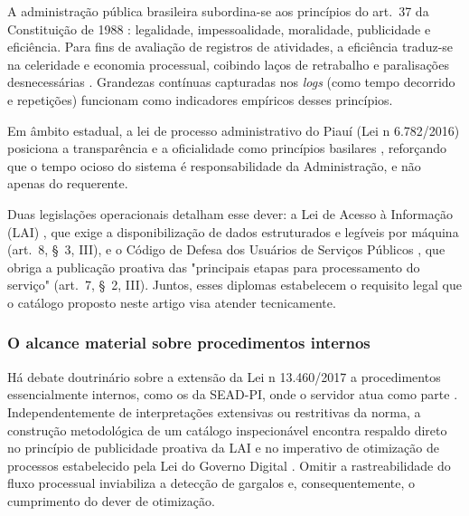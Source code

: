 A administração pública brasileira subordina-se aos princípios do art.~37 da Constituição de 1988 \cite{brasil1988cf}: legalidade, impessoalidade, moralidade, publicidade e eficiência. Para fins de avaliação de registros de atividades, a eficiência traduz-se na celeridade e economia processual, coibindo laços de retrabalho e paralisações desnecessárias \cite[p.~180-185]{brchicoski2004eficiencia}. Grandezas contínuas capturadas nos \emph{logs} (como tempo decorrido e repetições) funcionam como indicadores empíricos desses princípios.

Em âmbito estadual, a lei de processo administrativo do Piauí (Lei n\textordmasculine{} 6.782/2016) posiciona a transparência e a oficialidade como princípios basilares \cite[art.~2\textordmasculine{}]{state2016procedurelaw}, reforçando que o tempo ocioso do sistema é responsabilidade da Administração, e não apenas do requerente.

Duas legislações operacionais detalham esse dever: a Lei de Acesso à Informação (LAI) \cite{brasil2011lai}, que exige a disponibilização de dados estruturados e legíveis por máquina (art.~8\textordmasculine{}, \S~3\textordmasculine{}, III), e o Código de Defesa dos Usuários de Serviços Públicos \cite{brasil2017cdu}, que obriga a publicação proativa das "principais etapas para processamento do serviço" (art.~7\textordmasculine{}, \S~2\textordmasculine{}, III). Juntos, esses diplomas estabelecem o requisito legal que o catálogo proposto neste artigo visa atender tecnicamente.

\subsubsection{O alcance material sobre procedimentos internos}
\label{sec:rev-alcance}

Há debate doutrinário sobre a extensão da Lei n\textordmasculine{} 13.460/2017 a procedimentos essencialmente internos, como os da SEAD-PI, onde o servidor atua como parte \cite{brcgu2018ouvidoria, brmarrara2018cdusp, brcgu2024portaria116, brjuruena2021usuario}. Independentemente de interpretações extensivas ou restritivas da norma, a construção metodológica de um catálogo inspecionável encontra respaldo direto no princípio de publicidade proativa da LAI e no imperativo de otimização de processos estabelecido pela Lei do Governo Digital \cite{brasil2021govdigital}. Omitir a rastreabilidade do fluxo processual inviabiliza a detecção de gargalos e, consequentemente, o cumprimento do dever de otimização.

